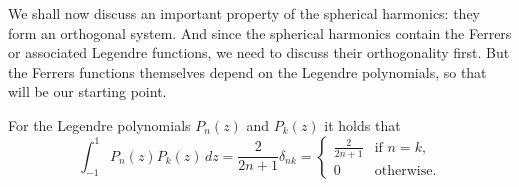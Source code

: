 We shall now discuss an important property of the spherical harmonics: they form
an orthogonal system. And since the spherical harmonics contain the Ferrers or
associated Legendre functions, we need to discuss their orthogonality first.
But the Ferrers functions themselves depend on the Legendre polynomials, so that
will be our starting point.

\begin{lemma} For the Legendre polynomials $P_n(z)$ and $P_k(z)$ it holds that
  \label{kugel:thm:legendre-poly-ortho}
  \begin{equation*}
    \int_{-1}^1 P_n(z) P_k(z) \, dz
    = \frac{2}{2n + 1} \delta_{nk}
    = \begin{cases}
      \frac{2}{2n + 1} & \text{if } n = k, \\
      0 & \text{otherwise}.
    \end{cases}
  \end{equation*}
\end{lemma}
